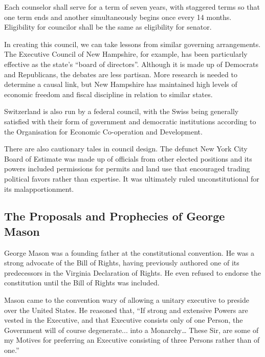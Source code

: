 \documentclass{article}
\newcommand{\quotes}[1]{``#1''}
\begin{document}
\begin{quoting}
Each counselor shall serve for a term of seven years, with staggered terms so that one term ends and another simultaneously begins once every 14 months. Eligibility for councilor shall be the same as eligibility for senator.
\end{quoting}

In creating this council, we can take lessons from similar governing arrangements\cite{Khanna}. The Executive Council of New Hampshire, for example, has been particularly effective as the state's \quotes{board of directors}\cite{Hahn-Burkett}. Although it is made up of Democrats and Republicans, the debates are less partisan\cite{Timmins}. More research is needed to determine a causal link, but New Hampshire has maintained high levels of economic freedom and fiscal discipline in relation to similar states\cite{Ruger}.

Switzerland is also run by a federal council, with the Swiss being generally satisfied with their form of government and democratic institutions according to the Organisation for Economic Co-operation and Development\cite{Kaufman}.

There are also cautionary tales in council design. The defunct New York City Board of Estimate was made up of officials from other elected positions and its powers included permissions for permits and land use that encouraged trading political favors rather than expertise\cite{Purnick}. It was ultimately ruled unconstitutional for its malapportionment\cite{Board_of_Estimate}.

\subsection{The Proposals and Prophecies of George Mason}

George Mason was a founding father at the constitutional convention. He was a strong advocate of the Bill of Rights, having previously authored one of its predecessors in the Virginia Declaration of Rights. He even refused to endorse the constitution until the Bill of Rights was included.

Mason came to the convention wary of allowing a unitary executive to preside over the United States. He reasoned that, \quotes{If strong and extensive Powers are vested in the Executive, and that Executive consists only of one Person, the Government will of course degenerate... into a Monarchy… These Sir, are some of my Motives for preferring an Executive consisting of three Persons rather than of one.}\cite{Mason}
\end{document}
